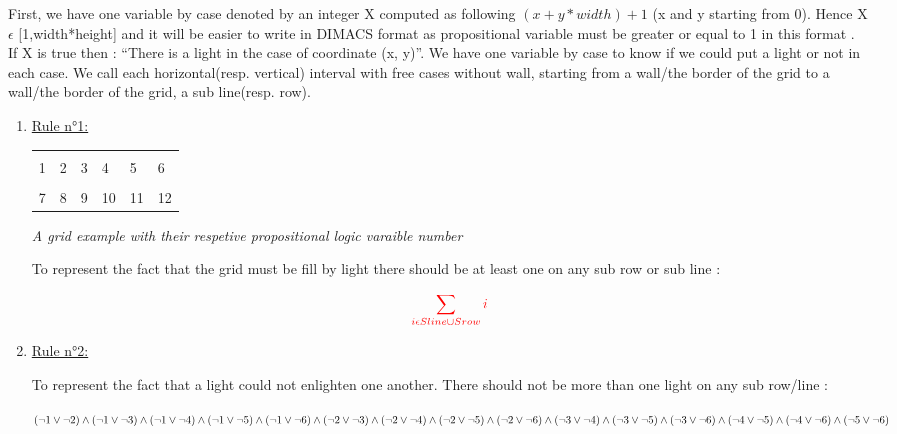 \documentclass[a4paper]{article}
\begin{document}
First, we have one variable by case denoted by an integer X computed as following $(x+y*width)+1$ (x and y starting from 0). Hence X $ \epsilon $ [1,width*height] and it will be easier to write in DIMACS format as propositional variable must be greater or equal to 1 in this format . If X is true then : “There is a light in the case of coordinate (x, y)”. We have one variable by case to know if we could put a light or not in each case.
We call each horizontal(resp. vertical) interval with free cases without wall, starting from a wall/the border of the grid to a wall/the border of the grid, a sub line(resp. row).

\begin{enumerate}

	\item \underline{Rule n°1:}
	\medskip
	\newline
	
		\begin{tabular}{|m{}|m{}|m{}|m{}|m{}|m{}|}
        \hline
         \cellcolor[gray]{0.5} &   &   &   &   &   \\[1ex]
         \cellcolor[gray]{0.5} 1 & 2 & 3 & 4 & 5 & 6 \\[2ex]
        \hline
            &   & \cellcolor[gray]{0.5}   &   &   &   \\[1ex]
          7 & 8 & \cellcolor[gray]{0.5} 9 & 10 & 11 & 12 \\[2ex]
        \hline
      \end{tabular}

\textit{A grid example with their respetive propositional logic varaible number}

To represent the fact that the grid must be fill by light there should be at least one on any sub row or sub line : 
\begin{center}
$$ \textcolor{red}{\sum_{i \epsilon Sline \cup Srow} i} $$
\end{center} 
	\item \underline{Rule n°2:}
	\medskip
	\newline

To represent the fact that a light could not enlighten one another. There should not be more than one light on any sub row/line : 
\begin{center}
\textcolor{blue}{$ (\neg1 \lor \neg2) \land (\neg1 \lor \neg 3) \land (\neg 1\lor \neg 4) \land (\neg1\lor \neg5) \land (\neg1 \lor \neg 6) \land (\neg 2 \lor \neg 3) \land (\neg2 \lor \neg 4) \land (\neg 2 \lor \neg5) \newline \land (\neg2 \lor \neg6) \land (\neg3 \lor \neg4) \land (\neg3 \lor \neg5) \land (\neg3 \lor \neg6)  \land (\neg 4 \lor \neg 5) \land (\neg 4 \lor \neg 6)\land(\neg5 \lor \neg6)$}
\end{center} 


\end{enumerate}
\end{document}
